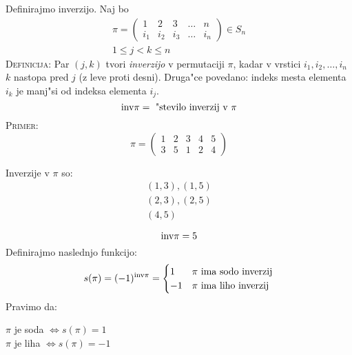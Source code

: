Definirajmo inverzijo. Naj bo
\begin{gather*}
\pi = \begin{pmatrix}
1 & 2 & 3 & \ldots & n \\
i_1 & i_2 & i_3 & \ldots & i_n
\end{pmatrix} \in S_n \\
1 \leq j < k \leq n
\end{gather*}
\textsc{Definicija:} Par $(j, k)$ tvori \emph{inverzijo} v permutaciji $\pi$, kadar v vrstici $i_1, i_2, \ldots, i_n$ $k$ nastopa pred $j$ (z leve proti desni). Druga"ce povedano: indeks mesta elementa $i_k$ je manj"si od indeksa elementa $i_j$.
\begin{equation*}
\text{inv} \pi = \text{ "stevilo inverzij v $\pi$}
\end{equation*}
%
\textsc{Primer:}
\begin{equation*}
\pi = \begin{pmatrix}
1 & 2 & 3 & 4 & 5 \\
3 & 5 & 1 & 2 & 4
\end{pmatrix}
\end{equation*}
\begin{multicols}{2}
	Inverzije v $\pi$ so:
	\columnbreak
	\begin{gather*}
		(1, 3), (1, 5) \\
		(2, 3), (2, 5) \\
		(4, 5)
	\end{gather*}
\end{multicols}
\begin{equation*}
\text{inv} \pi = 5
\end{equation*}
Definirajmo naslednjo funkcijo:
\begin{equation*}
s(\pi) = (-1)^{\text{inv} \pi} = \begin{cases}
1 & \text{$\pi$ ima sodo inverzij} \\
-1 & \text{$\pi$ ima liho inverzij}
\end{cases}
\end{equation*}
Pravimo da:

$\pi$ je soda $\iff s(\pi) = 1$ \\
$\pi$ je liha $\iff s(\pi) = -1$

